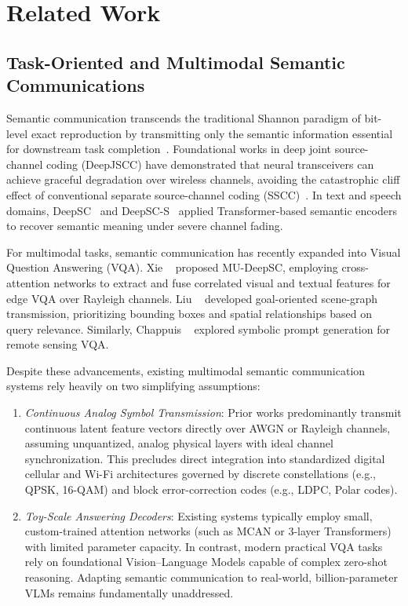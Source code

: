 \section{Related Work}\label{sec:related}

\subsection{Task-Oriented and Multimodal Semantic Communications}
Semantic communication transcends the traditional Shannon paradigm of bit-level exact reproduction by transmitting only the semantic information essential for downstream task completion~\cite{qin2021semantic,gunduz2023beyond}. Foundational works in deep joint source-channel coding (DeepJSCC) have demonstrated that neural transceivers can achieve graceful degradation over wireless channels, avoiding the catastrophic cliff effect of conventional separate source-channel coding (SSCC)~\cite{bourtsoulatze2019djscc,kurka2020deepjsccf}. In text and speech domains, DeepSC~\cite{xie2021deepsc} and DeepSC-S~\cite{weng2021semantic} applied Transformer-based semantic encoders to recover semantic meaning under severe channel fading.

For multimodal tasks, semantic communication has recently expanded into Visual Question Answering (VQA). Xie \etal~\cite{xie2022mudeepscwcl,xie2021mudeepsc} proposed MU-DeepSC, employing cross-attention networks to extract and fuse correlated visual and textual features for edge VQA over Rayleigh channels. Liu \etal~\cite{liu2024gosg} developed goal-oriented scene-graph transmission, prioritizing bounding boxes and spatial relationships based on query relevance. Similarly, Chappuis \etal~\cite{chappuis2022promptrsvqa} explored symbolic prompt generation for remote sensing VQA. 

Despite these advancements, existing multimodal semantic communication systems rely heavily on two simplifying assumptions:
\begin{enumerate}
    \item \emph{Continuous Analog Symbol Transmission}: Prior works predominantly transmit continuous latent feature vectors directly over AWGN or Rayleigh channels, assuming unquantized, analog physical layers with ideal channel synchronization. This precludes direct integration into standardized digital cellular and Wi-Fi architectures governed by discrete constellations (e.g., QPSK, 16-QAM) and block error-correction codes (e.g., LDPC, Polar codes).
    \item \emph{Toy-Scale Answering Decoders}: Existing systems typically employ small, custom-trained attention networks (such as MCAN or 3-layer Transformers) with limited parameter capacity. In contrast, modern practical VQA tasks rely on foundational Vision--Language Models capable of complex zero-shot reasoning. Adapting semantic communication to real-world, billion-parameter VLMs remains fundamentally unaddressed.
\end{enumerate}

